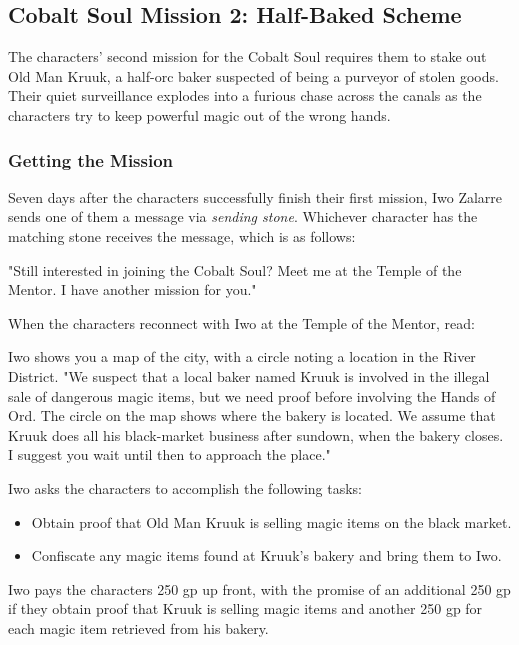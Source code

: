 \documentclass[a4paper, 11pt, bg=full, twocolumn, nooutline]{dndbook}
\begin{document}
\subsection{Cobalt Soul Mission 2: Half-Baked Scheme}

The characters' second mission for the Cobalt Soul requires them to stake out Old Man Kruuk, a half-orc baker suspected of being a purveyor of stolen goods. Their quiet surveillance explodes into a furious chase across the canals as the characters try to keep powerful magic out of the wrong hands.

\subsubsection{Getting the Mission}

Seven days after the characters successfully finish their first mission, Iwo Zalarre sends one of them a message via \textit{sending stone}. Whichever character has the matching stone receives the message, which is as follows:

\begin{DndReadAloud}
"Still interested in joining the Cobalt Soul? Meet me at the Temple of the Mentor. I have another mission for you."
\end{DndReadAloud}

When the characters reconnect with Iwo at the Temple of the Mentor, read:

\begin{DndReadAloud}
Iwo shows you a map of the city, with a circle noting a location in the River District. "We suspect that a local baker named Kruuk is involved in the illegal sale of dangerous magic items, but we need proof before involving the Hands of Ord. The circle on the map shows where the bakery is located. We assume that Kruuk does all his black-market business after sundown, when the bakery closes. I suggest you wait until then to approach the place."
\end{DndReadAloud}

Iwo asks the characters to accomplish the following tasks:

\begin{itemize}
\item Obtain proof that Old Man Kruuk is selling magic items on the black market.
\item Confiscate any magic items found at Kruuk's bakery and bring them to Iwo.
\end{itemize}

Iwo pays the characters 250 gp up front, with the promise of an additional 250 gp if they obtain proof that Kruuk is selling magic items and another 250 gp for each magic item retrieved from his bakery.
\end{document}
